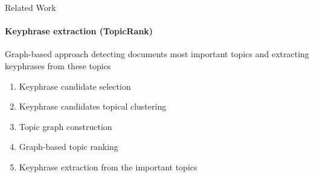 \begin{frame}{Related Work}\framesubtitle{Keyphrase extraction (TopicRank)}\vspace{.5em}
  Graph-based approach detecting documents most important topics and extracting keyphrases from these topics
  
  \vspace{.75em}
  
  \begin{enumerate}
    \item{Keyphrase candidate selection\hfill{}}
    \item{Keyphrase candidates topical clustering\hfill{}}
    \item{Topic graph construction\hfill{}}
    \item{Graph-based topic ranking\hfill{}}
    \item{Keyphrase extraction from the important topics\hfill{}}
  \end{enumerate}
  
  \vspace{.5em}
  

\end{frame}
